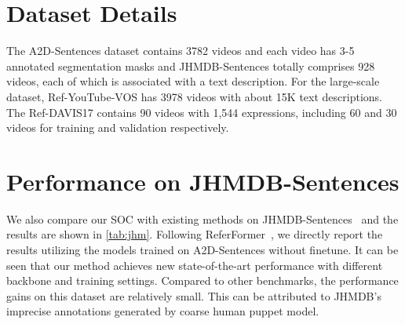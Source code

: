 \documentclass{article}
\begin{document}
\section{Dataset Details} \label{app:a}
The A2D-Sentences dataset contains 3782 videos and each video has 3-5 annotated segmentation masks and JHMDB-Sentences totally comprises 928 videos, each of which is associated with a text description. For the large-scale dataset, Ref-YouTube-VOS has 3978 videos with about 15K text descriptions. The Ref-DAVIS17 contains 90 videos with 1,544 expressions, including 60 and 30 videos for training and validation respectively.

\section{Performance on JHMDB-Sentences} \label{app:jhmdb}
We also compare our SOC with existing methods on JHMDB-Sentences~\cite{GavrilyukGLS18} and the results are shown in \cref{tab:jhm}. Following ReferFormer~\cite{referformer}, we directly report the results utilizing the models trained on A2D-Sentences without finetune. It can be seen that our method achieves new state-of-the-art performance with different backbone and training settings. Compared to other benchmarks, the performance gains on this dataset are relatively small. This can be attributed to JHMDB's imprecise annotations generated by coarse human puppet model.
\end{document}

